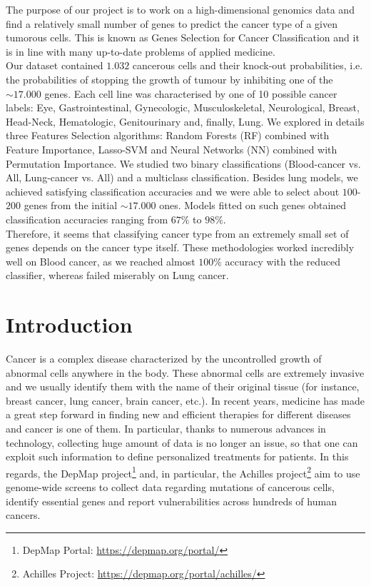 \documentclass[a4paper,11pt, oneside]{article}  %
\begin{document}
	The purpose of our project is to work on a high-dimensional genomics data and find a relatively small number of genes to predict the cancer type of a given tumorous cells. This is known as Genes Selection for Cancer Classification and it is in line with many up-to-date problems of applied medicine. \\
	Our dataset contained $1.032$ cancerous cells and their knock-out probabilities, i.e. the probabilities of stopping the growth of tumour by inhibiting one of the $\sim 17.000$ genes. Each cell line was characterised by one of 10 possible cancer labels: Eye, Gastrointestinal, Gynecologic, Musculoskeletal, Neurological, Breast, Head-Neck, Hematologic, Genitourinary and, finally, Lung. We explored in details three Features Selection algorithms: Random Forests (RF) combined with Feature Importance, Lasso-SVM and Neural Networks (NN) combined with Permutation Importance. We studied two binary classifications (Blood-cancer vs. All, Lung-cancer vs. All) and a multiclass classification. Besides lung models, we achieved satisfying classification accuracies and we were able to select about $100$-$200$ genes from the initial $\sim 17.000$ ones. Models fitted on such genes obtained classification accuracies ranging from $67\%$ to $98\%$. \\
	Therefore, it seems that classifying cancer type from an extremely small set of genes depends on the cancer type itself. These methodologies worked incredibly well on Blood cancer, as we reached almost $100\%$ accuracy with the reduced classifier, whereas failed miserably on Lung cancer.  
	
	
	\section{Introduction}
	Cancer is a complex disease characterized by the uncontrolled growth of abnormal cells anywhere in the body. These abnormal cells are extremely invasive and we usually identify them with the name of their original tissue (for instance, breast cancer, lung cancer,  brain cancer, etc.).  In recent years, medicine has made a great step forward in finding new and efficient therapies for different diseases and cancer is one of them.  In particular,  thanks to numerous advances in technology,  collecting huge amount of data is no longer an issue, so that one can exploit such information to define personalized treatments for patients. In this regards, the DepMap project\footnote{DepMap Portal: \url{https://depmap.org/portal/} } and,  in particular,  the Achilles project\footnote{Achilles Project: \url{https://depmap.org/portal/achilles/} } aim to use genome-wide screens to collect data regarding mutations of cancerous cells,  identify essential genes and report vulnerabilities across hundreds of human cancers.  \\
	
\end{document}
